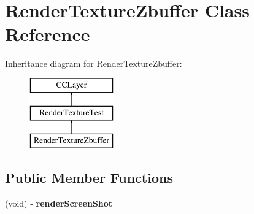 \hypertarget{interface_render_texture_zbuffer}{\section{Render\-Texture\-Zbuffer Class Reference}
\label{interface_render_texture_zbuffer}
}
Inheritance diagram for Render\-Texture\-Zbuffer\-:\begin{figure}[H]
\begin{center}
\leavevmode
\includegraphics[height=3.000000cm]{interface_render_texture_zbuffer}
\end{center}
\end{figure}
\subsection*{Public Member Functions}
\begin{DoxyCompactItemize}
\item 
\hypertarget{interface_render_texture_zbuffer_a741e0f364bdb74d83b91ee0b2daf1011}{(void) -\/ {\bfseries render\-Screen\-Shot}}\label{interface_render_texture_zbuffer_a741e0f364bdb74d83b91ee0b2daf1011}

\end{DoxyCompactItemize}
